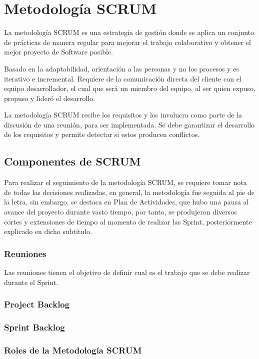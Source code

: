 \section{Metodología SCRUM}

La metodología SCRUM es una estrategia de gestión donde se aplica un conjunto de prácticas de manera regular para mejorar el trabajo colaborativo y obtener el mejor proyecto de Software posible\cite{scrumdiapo}.

Basado en la adaptabilidad, orientación a las personas y no los procesos y es iterativo e incremental. Requiere de la comunicación directa del cliente con el equipo desarrollador, el cual que será un miembro del equipo, al ser quien expuso, propuso y lideró el desarrollo.

La metodología SCRUM recibe los requisitos y los involucra como parte de la discusión de una reunión, para ser implementada. Se debe garantizar el desarrollo de los requisitos y permite detectar si estos producen conflictos.

\subsection{Componentes de SCRUM}

Para realizar el seguimiento de la metodología SCRUM, se requiere tomar nota de todas las decisiones realizadas, en general, la metodología fue seguida al pie de la letra, sin embargo, se destaca en Plan de Actividades, que hubo una pausa al avance del proyecto durante vasto tiempo, por tanto, se produjeron diversos cortes y extensiones de tiempo al momento de realizar las Sprint, posteriormente explicado en dicho subtitulo.

\subsubsection{Reuniones}

Las reuniones tienen el objetivo de definir cual es el trabajo que se debe realizar durante el Sprint.

\subsubsection{Project Backlog}
\subsubsection{Sprint Backlog}

\subsubsection{Roles de la Metodología SCRUM}

